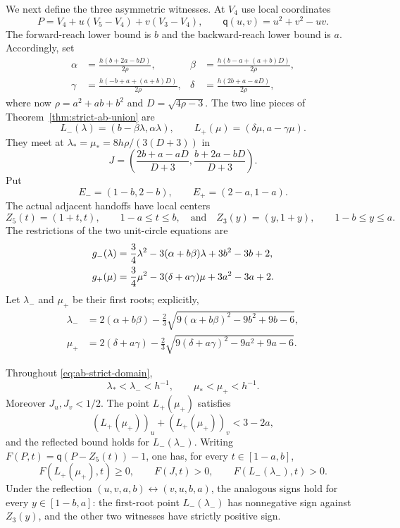 We next define the three asymmetric witnesses.  At $V_4$ use local
coordinates
\[
 P=V_4+u(V_5-V_4)+v(V_3-V_4),\qquad
 \mathsf q(u,v)=u^2+v^2-uv.
\]
The forward-reach lower bound is $b$ and the backward-reach lower bound is $a$.  Accordingly,
set
\begin{align*}
 \alpha&=\frac{h(b+2a-bD)}{2\rho},&
 \beta&=\frac{h(b-a+(a+b)D)}{2\rho},\\
 \gamma&=\frac{h(-b+a+(a+b)D)}{2\rho},&
 \delta&=\frac{h(2b+a-aD)}{2\rho},
\end{align*}
where now $\rho=a^2+ab+b^2$ and $D=\sqrt{4\rho-3}$.  The two line pieces of
Theorem~\ref{thm:strict-ab-union} are
\[
 L_-(\lambda)=(b-\beta\lambda,\alpha\lambda),\qquad
 L_+(\mu)=(\delta\mu,a-\gamma\mu).
\]
They meet at $\lambda_* =\mu_*=8h\rho/(3(D+3))$ in
\begin{equation}
 J=\left(\frac{2b+a-aD}{D+3},
          \frac{b+2a-bD}{D+3}\right).           \label{eq:line-junction}
\end{equation}
Put
\[
 E_-=(1-b,2-b),\qquad E_+=(2-a,1-a).
\]
The actual adjacent handoffs have local centers
\[
 Z_5(t)=(1+t,t),\qquad 1-a\le t\le b,
 \quad\text{and}\quad
 Z_3(y)=(y,1+y),\qquad 1-b\le y\le a.
\]
The restrictions of the two unit-circle equations are
\begin{align}
 g_-(\lambda)&=\frac34\lambda^2
 -3(\alpha+b\beta)\lambda+3b^2-3b+2,\notag\\
 g_+(\mu)&=\frac34\mu^2
 -3(\delta+a\gamma)\mu+3a^2-3a+2.              \label{eq:witness-quadratics}
\end{align}
Let $\lambda_-$ and $\mu_+$ be their first roots; explicitly,
\begin{align*}
 \lambda_-&=2(\alpha+b\beta)
 -\frac23\sqrt{9(\alpha+b\beta)^2-9b^2+9b-6},\\
 \mu_+&=2(\delta+a\gamma)
 -\frac23\sqrt{9(\delta+a\gamma)^2-9a^2+9a-6}.
\end{align*}

\begin{lemma}
\label{lem:fixed-line-signs}
Throughout \eqref{eq:ab-strict-domain},
\begin{equation}
 \lambda_*<\lambda_-<h^{-1},\qquad
 \mu_*<\mu_+<h^{-1}.                            \label{eq:first-root-order}
\end{equation}
Moreover $J_u,J_v<1/2$.  The point $L_+(\mu_+)$ satisfies
\[
 (L_+(\mu_+))_u+(L_+(\mu_+))_v<3-2a,
\]
and the reflected bound holds for $L_-(\lambda_-)$.  Writing
$F(P,t)=\mathsf q(P-Z_5(t))-1$, one has, for every $t\in[1-a,b]$,
\begin{equation}
 F(L_+(\mu_+),t)\ge0,\qquad F(J,t)>0,\qquad
 F(L_-(\lambda_-),t)>0.                           \label{eq:moving-right-signs}
\end{equation}
Under the reflection
$(u,v,a,b)\leftrightarrow(v,u,b,a)$, the analogous signs hold for every
$y\in[1-b,a]$: the first-root point $L_-(\lambda_-)$ has nonnegative sign
against $Z_3(y)$, and the other two witnesses have strictly positive sign.
\end{lemma}

